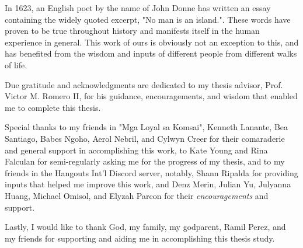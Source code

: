 
In 1623, an English poet by the name of John Donne has written an essay containing the widely quoted excerpt, "No man is an island.". These words have proven to be true throughout history and manifests itself in the human experience in general. This work of ours is obviously not an exception to this, and has benefited from the wisdom and inputs of different people from different walks of life.

Due gratitude and acknowledgments are dedicated to my thesis advisor, Prof. Victor M. Romero II, for his guidance, encouragements, and wisdom that enabled me to complete this thesis.

Special thanks to my friends in "Mga Loyal sa Komsai", Kenneth Lanante, Bea Santiago, Babes Ngoho, Aerol Nebril, and Cylwyn Creer for their comaraderie and general support in accomplishing this work, to Kate Young and Rina Falculan for semi-regularly asking me for the progress of my thesis, and to my friends in the Hangouts Int'l Discord server, notably, Shann Ripalda for providing inputs that helped me improve this work, and Denz Merin, Julian Yu, Julyanna Huang, Michael Omisol, and Elyzah Parcon for their \textit{encouragements} and support.

Lastly, I would like to thank God, my family, my godparent, Ramil Perez, and my friends for supporting and aiding me in accomplishing this thesis study.

